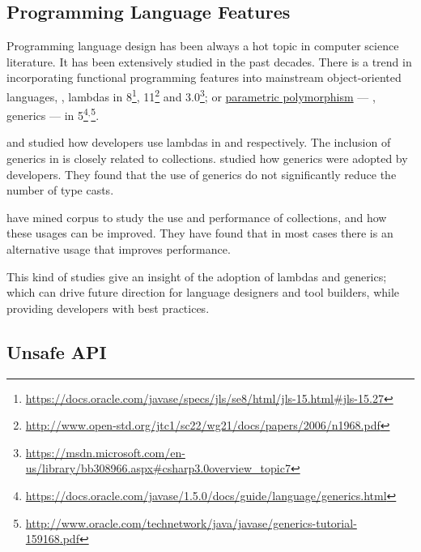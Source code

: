 \subsection*{Programming Language Features}

Programming language design has been always a hot topic in computer science literature.
It has been extensively studied in the past decades.
There is a trend in incorporating functional programming features into mainstream object-oriented languages, \eg,
lambdas in \java{} 8\footnote{\url{https://docs.oracle.com/javase/specs/jls/se8/html/jls-15.html\#jls-15.27}},
\cpp{}11\footnote{\url{http://www.open-std.org/jtc1/sc22/wg21/docs/papers/2006/n1968.pdf}} and
\cs{} 3.0\footnote{\url{https://msdn.microsoft.com/en-us/library/bb308966.aspx\#csharp3.0overview\_topic7}};
or \underline{parametric polymorphism}   --- \ie{}, generics --- in \java{} 5\footnote{\url{https://docs.oracle.com/javase/1.5.0/docs/guide/language/generics.html}}\(^{,}\)\footnote{\url{http://www.oracle.com/technetwork/java/javase/generics-tutorial-159168.pdf}}.

\cite{mazinanianUnderstandingUseLambda2017} and \cite{uesbeckEmpiricalStudyImpact2016} studied how developers use lambdas in \java{} and \cpp{} respectively.
The inclusion of generics in \java{} is closely related to collections. 
\cite{parninJavaGenericsAdoption2011,parninAdoptionUseJava2013} studied how generics were adopted by \java{} developers.
They found that the use of generics do not significantly reduce the number of type casts.

\cite{costaEmpiricalStudyUsage2017} have mined \github{} corpus to study the use and performance of collections, and how these usages can be improved.
They have found
that in most cases there is an alternative usage that improves performance.

This kind of studies give an insight of the adoption of lambdas and generics; which can drive future direction for language designers and tool builders, while providing developers with best practices.

\subsection*{Unsafe API}
\label{sec:lr:unsafe}

